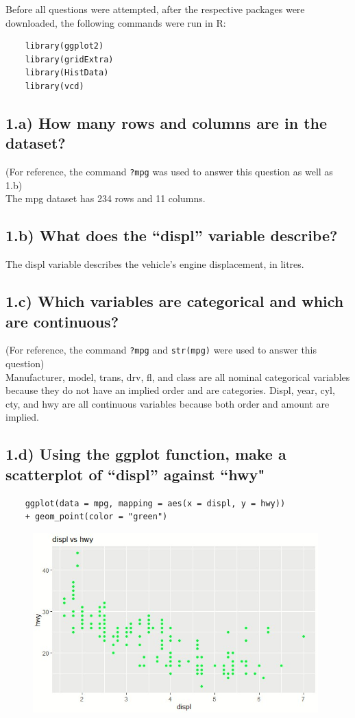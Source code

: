 \documentclass[11pt]{article}
\begin{document}
Before all questions were attempted, after the respective packages were downloaded, the following commands were run in R:

\begin{verbatim}
    library(ggplot2)
    library(gridExtra)
    library(HistData)
    library(vcd)
\end{verbatim}

\subsection*{1.a) How many rows and columns are in the dataset?}
(For reference, the command \verb|?mpg| was used to answer this question as well as 1.b) \\
The mpg dataset has 234 rows and 11 columns.

\subsection*{1.b) What does the “displ” variable describe?}
The displ variable describes the vehicle's engine displacement, in litres. 

\subsection*{1.c) Which variables are categorical and which are continuous?}
(For reference, the command \verb|?mpg| and \verb|str(mpg)| were used to answer this question) \\
Manufacturer, model, trans, drv, fl, and class are all nominal categorical variables because they do not have an implied order and are categories. Displ, year, cyl, cty, and hwy are all continuous variables because both order and amount are implied.

\subsection*{1.d) Using the ggplot function, make a scatterplot of “displ” against “hwy"}
\begin{verbatim}
    ggplot(data = mpg, mapping = aes(x = displ, y = hwy)) 
    + geom_point(color = "green")
\end{verbatim}

\begin{figure}[H]
\includegraphics[width = 11cm]{1d.jpg}
\centering
\end{figure}
\end{document}
